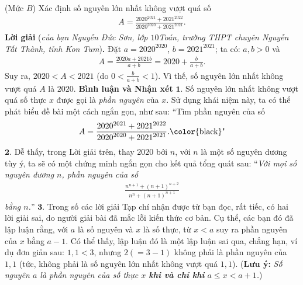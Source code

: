 \begin{multicols}{2}
\begin{flushright}
	\end{flushright}
	{}
	(Mức $B$) Xác định số nguyên lớn nhất không vượt quá số
	\begin{align*}
		A = \frac{{{{2020}^{2021}} + {{2021}^{2022}}}}{{{{2020}^{2020}} + {{2021}^{2021}}}}.
	\end{align*}
	\textbf{\color{thachthuctoanhoc}Lời giải} (\textit{của bạn Nguyễn Đức Sơn, lớp $10$\linebreak Toán, trường THPT chuyên Nguyễn Tất Thành, tỉnh Kon Tum})\textbf{\color{thachthuctoanhoc}.}
	\vskip 0.05cm
	Đặt $a = {2020^{2020}}$, $b = {2021^{2021}}$;  ta có: $a, b > 0$ và
	\begin{align*}
		A = \frac{{2020a + 2021b}}{{a + b}} = 2020 + \frac{b}{{a + b}}.
	\end{align*}
	Suy ra, $2020 < A < 2021$ (do  $0 < \frac{b}{{a + b}} < 1$). Vì thế, số nguyên lớn nhất không vượt quá $A$ là $2020$.
	\vskip 0.05cm
	\textbf{\color{thachthuctoanhoc}Bình luận và Nhận xét}
	\vskip 0.05cm
	$\pmb{1.}$ Số nguyên lớn nhất không vượt quá số thực $x$ được gọi là \textit{phần nguyên} của $x$. Sử dụng khái niệm này, ta có thể phát biểu đề bài một cách ngắn gọn, như sau: “Tìm phần nguyên của số 
	\begin{align*}
		A = \frac{{{{2020}^{2021}} + {{2021}^{2022}}}}{{{{2020}^{2020}} + {{2021}^{2021}}}}. \text{\color{black}"}
	\end{align*}
	$\pmb{2.}$ Dễ thấy, trong Lời giải trên, thay $2020$ bởi $n$, với $n$ là một số nguyên dương tùy ý, ta sẽ có một chứng minh ngắn gọn cho kết quả tổng quát sau:
	\vskip 0.05cm
	“\textit{Với mọi số nguyên dương $n$, phần nguyên của số 
	\begin{align*}
		\frac{{{n^{n + 1}} + {{\left( {n + 1} \right)}^{n + 2}}}}{{{n^n} + {{\left( {n + 1} \right)}^{n + 1}}}}
	\end{align*}  
	bằng $n$.}”
	\vskip 0.05cm
	$\pmb{3.}$ Trong số các lời giải Tạp chí nhận được từ bạn đọc, rất tiếc, có hai lời giải sai, do người giải bài đã mắc lỗi kiến thức cơ bản. Cụ thể, các bạn đó đã lập luận rằng, với $a$ là số nguyên và $x$ là số thực, từ $x < a$ suy ra phần nguyên của $x$ bằng $a - 1$. Có thể thấy, lập luận đó là một lập luận sai qua, chẳng hạn, ví dụ đơn giản sau: $1,1 < 3$, nhưng $2 (= 3 - 1)$ không phải là phần nguyên của $1,1$ (tức, không phải là số nguyên lớn nhất không vượt quá $1,1$).
	\vskip 0.05cm
	(\textbf{\color{thachthuctoanhoc}Lưu ý:} \textit{Số nguyên $a$ là phần nguyên của số thực $x$ \textbf{\color{thachthuctoanhoc}khi và chỉ khi} $a \le x < a + 1$.})

\end{multicols}
